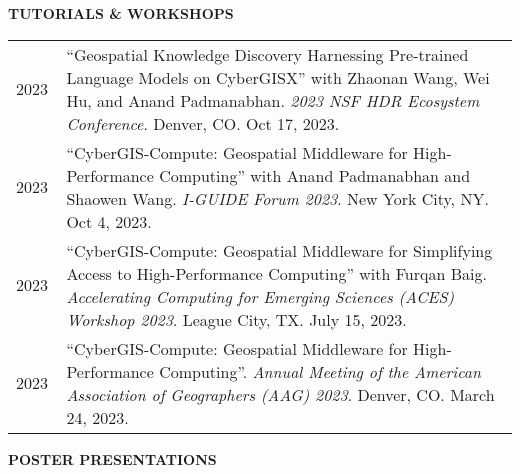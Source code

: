 \documentclass{acmcv}
\begin{document}
\begin{longtable}{p{0.1\linewidth} p{0.9\linewidth}}


    \end{longtable}
    \vspace*{-0.2cm}
    
    \textbf{\uppercase{Tutorials \& Workshops}}
    \vspace*{-0.35cm}
    \begin{longtable}{p{0.1\linewidth} p{0.9\linewidth}}
        2023 & ``Geospatial Knowledge Discovery Harnessing Pre-trained Language Models on CyberGISX'' with Zhaonan Wang, Wei Hu, and Anand Padmanabhan. \textit{2023 NSF HDR Ecosystem Conference}. Denver, CO. Oct 17, 2023.\\

        2023 & ``CyberGIS-Compute: Geospatial Middleware for High-Performance Computing'' with Anand Padmanabhan and Shaowen Wang. \textit{I-GUIDE Forum 2023}. New York City, NY. Oct 4, 2023.\\

        2023 & ``CyberGIS-Compute: Geospatial Middleware for Simplifying Access to High-Performance Computing'' with Furqan Baig. \textit{Accelerating Computing for Emerging Sciences (ACES) Workshop 2023}. League City, TX. July 15, 2023.\\

        2023 & ``CyberGIS-Compute: Geospatial Middleware for High-Performance Computing''. \textit{Annual Meeting of the American Association of Geographers (AAG) 2023}. Denver, CO. March 24, 2023.\\

    \end{longtable}
    \vspace*{-0.2cm}

    \textbf{\uppercase{Poster Presentations}}
    \vspace*{-0.3cm}
\end{document}
